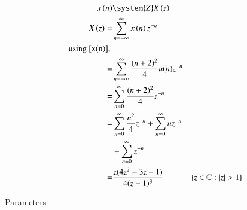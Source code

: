 \documentclass[journal,12pt,twocolumn]{IEEEtran}
\begin{document}
\begin{align}
    x \brak{n} & \system{Z} X \brak{z} \\
    X \brak{z} = &  \sum_{n=-\infty}^{\infty} x \brak{n}   z^{-n} \\
    \notag \text{using \eqref{x(n)}, } \\
    = & \sum_{n=-\infty}^{\infty} \frac{(n + 2)^2}{4}u(n) z^{-n} \\
    = & \sum_{n=0}^{\infty} \frac{(n + 2)^2}{4} z^{-n} \\
    = & \sum_{n=0}^{\infty} \frac{n^2}{4}z^{-n} + \sum_{n=0}^{\infty} nz^{-n} \\
    & + \sum_{n=0}^{\infty} z^{-n} \notag\\ %
    = & \frac{z(4z^2 - 3z + 1)}{4(z - 1)^3} & \cbrak{z\in\mathbb{C} : |z|>1}
\end{align}
\begin{table}[h]
    \centering
    
    \caption{Parameters}
    \label{tab: 11.9.5.25.1}
\end{table}
\end{document}
